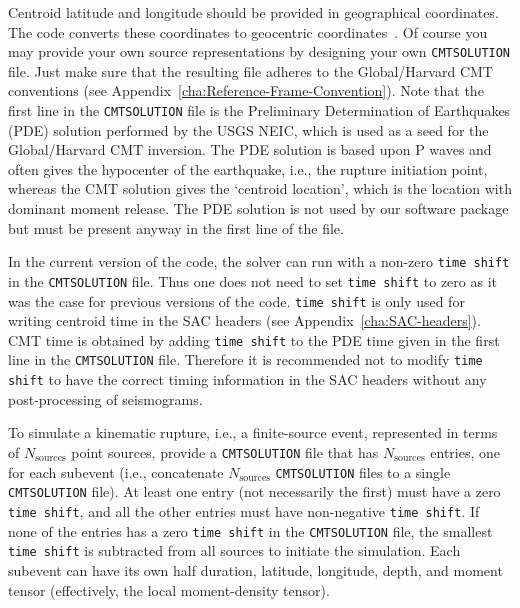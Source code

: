 Centroid latitude and longitude should be provided in geographical
coordinates. The code converts these coordinates to geocentric coordinates~\citep{DaTr98}.
Of course you may provide your own source representations by designing
your own \texttt{CMTSOLUTION} file. Just make sure that the resulting
file adheres to the Global/Harvard CMT conventions (see Appendix~\ref{cha:Reference-Frame-Convention}).
Note that the first line in the \texttt{CMTSOLUTION} file is the Preliminary Determination of Earthquakes (PDE) solution performed by the USGS NEIC, which is used as a seed for the Global/Harvard CMT inversion. The PDE solution is based upon P waves and often gives the hypocenter of the earthquake, i.e., the rupture initiation point, whereas the CMT solution gives the `centroid location', which is the location with dominant moment release. The PDE solution is not used by our software package but must be present anyway in the first line of the file.\newline


In the current version of the code, the solver can run with a non-zero \texttt{time shift} in the \texttt{CMTSOLUTION} file. Thus one does not need to set \texttt{time shift} to zero as it was the case for previous versions of the code. \texttt{time shift} is only used for writing centroid time in the SAC headers (see Appendix~\ref{cha:SAC-headers}). CMT time is obtained by adding \texttt{time shift} to the PDE time given in the first line in the \texttt{CMTSOLUTION} file. Therefore it is recommended not to modify \texttt{time shift} to have the correct timing information in the SAC headers without any post-processing of seismograms.\newline


\label{To-simulate-a}To simulate a kinematic rupture, i.e., a finite-source
event, represented in terms of $N_{\mathrm{sources}}$ point sources,
provide a \texttt{CMTSOLUTION} file that has $N_{\mathrm{sources}}$
entries, one for each subevent (i.e., concatenate $N_{\mathrm{sources}}$
\texttt{CMTSOLUTION} files to a single \texttt{CMTSOLUTION} file).
At least one entry (not necessarily the first) must have a zero \texttt{time
shift}, and all the other entries must have non-negative \texttt{time
shift}. If none of the entries has a zero \texttt{time shift} in the \texttt{CMTSOLUTION} file, the smallest \texttt{time shift} is subtracted from all sources to initiate the simulation. Each subevent can have its own half duration, latitude, longitude,
depth, and moment tensor (effectively, the local moment-density tensor).\newline


